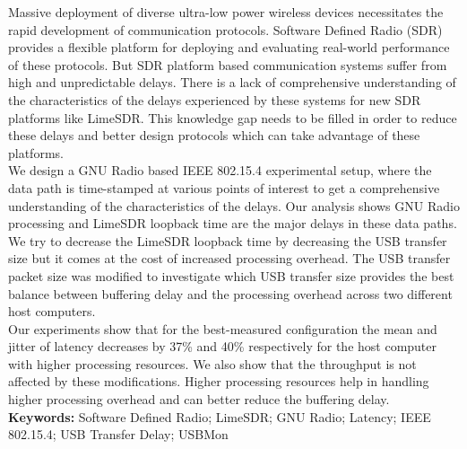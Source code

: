 
Massive deployment of diverse ultra-low power wireless devices necessitates the rapid development of communication protocols. Software Defined Radio (SDR) provides a flexible platform for deploying and evaluating real-world performance of these protocols. But SDR platform based communication systems suffer from high and unpredictable delays. There is a lack of comprehensive understanding of the characteristics of the delays experienced by these systems for new SDR platforms like LimeSDR. This knowledge gap needs to be filled in order to reduce these delays and better design protocols which can take advantage of these platforms.\\

We design a GNU Radio based IEEE 802.15.4 experimental setup, where the data path is time-stamped at various points of interest to get a comprehensive understanding of the characteristics of the delays. Our analysis shows GNU Radio processing and LimeSDR loopback time are the major delays in these data paths. We try to decrease the LimeSDR loopback time by decreasing the USB transfer size but it comes at the cost of increased processing overhead. The USB transfer packet size was modified to investigate which USB transfer size provides the best balance between buffering delay and the processing overhead across two different host computers.\\
 
Our experiments show that for the best-measured configuration the mean and jitter of latency decreases by 37\% and 40\% respectively for the host computer with higher processing resources. We also show that the throughput is not affected by these modifications. Higher processing resources help in handling higher processing overhead and can better reduce the buffering delay.\\

\noindent\textbf{Keywords:} Software Defined Radio; LimeSDR; GNU Radio; Latency; IEEE 802.15.4; USB Transfer Delay; USBMon